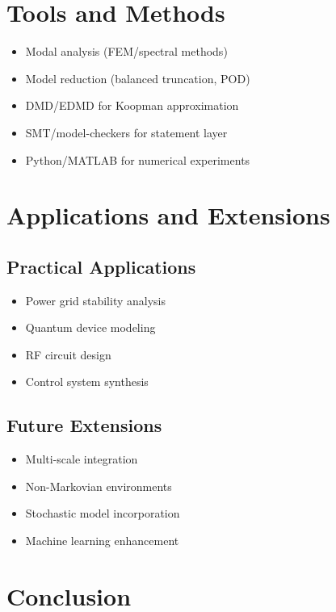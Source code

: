 \documentclass[11pt,a4paper]{article}
\begin{document}
\section{Tools and Methods}
\label{sec:tools}

\begin{itemize}
    \item Modal analysis (FEM/spectral methods)
    \item Model reduction (balanced truncation, POD)
    \item DMD/EDMD for Koopman approximation
    \item SMT/model-checkers for statement layer
    \item Python/MATLAB for numerical experiments
\end{itemize}

\section{Applications and Extensions}
\label{sec:applications}

\subsection{Practical Applications}
\begin{itemize}
    \item Power grid stability analysis
    \item Quantum device modeling
    \item RF circuit design
    \item Control system synthesis
\end{itemize}

\subsection{Future Extensions}
\begin{itemize}
    \item Multi-scale integration
    \item Non-Markovian environments
    \item Stochastic model incorporation
    \item Machine learning enhancement
\end{itemize}

\section{Conclusion}
\label{sec:conclusion}
\end{document}
